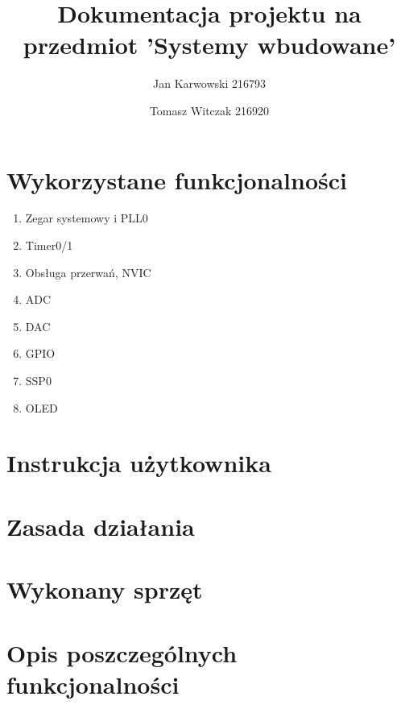 \documentclass{article}
\author{
    Jan Karwowski 216793
        \and
    Tomasz Witczak 216920
}
\title{Dokumentacja projektu na przedmiot 'Systemy wbudowane'}
\begin{document}
\maketitle
\newpage

\section{Wykorzystane funkcjonalności}
\begin{enumerate}
    \item Zegar systemowy i PLL0
    \item Timer0/1
    \item Obsługa przerwań, NVIC
    \item ADC
    \item DAC
    \item GPIO
    \item SSP0
    \item OLED
\end{enumerate}

\section{Instrukcja użytkownika}
\label{instrukcja_uzytkownika}


\section{Zasada działania}
\label{zasada_dzialania}


\section{Wykonany sprzęt}
\label{wykonany_sprzet}


\section{Opis poszczególnych funkcjonalności}
 \label{system_clock}
 \label{timer}
 \label{interrupts}
 \label{adc}
 \label{dac}
 \label{gpio}
 \label{ssp}
 \label{oled}
\end{document}
